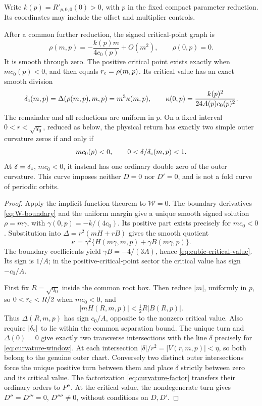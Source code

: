 Write \(k(p)=R'_{p,0,0}(0)>0\), with \(p\) in the fixed compact
parameter reduction. Its coordinates may include the offset and
multiplier controls.

\begin{proposition}
\label{prop:cubic-curvature-window}
After a common further reduction, the signed critical-point graph is
\[
 \rho(m,p)=-\frac{k(p)m}{4c_0(p)}+O(m^2),\qquad \rho(0,p)=0.
\]
It is smooth through zero. The positive critical point exists exactly
when \(mc_0(p)<0\), and then equals \(r_{\rm c}=\rho(m,p)\).
Its critical value has an exact smooth division
\begin{equation}\label{eq:cubic-critical-value}
 \delta_{\rm c}(m,p)=\Delta(\rho(m,p),m,p)=m^3\kappa(m,p),
 \qquad \kappa(0,p)=\frac{k(p)^2}{24A(p)c_0(p)^2}.
\end{equation}
The remainder and all reductions are uniform in \(p\).
On a fixed interval \(0<r<\sqrt{q_0}\), reduced as below, the
physical return has exactly two simple outer curvature zeros if and
only if
\begin{equation}\label{eq:curvature-window}
 mc_0(p)<0,\qquad 0<\delta/\delta_{\rm c}(m,p)<1.
\end{equation}
At \(\delta=\delta_{\rm c}\), \(mc_0<0\), it instead has one
ordinary double zero of the outer curvature. This curve imposes neither
\(D=0\) nor \(D'=0\), and is not a fold curve of periodic orbits.
\end{proposition}

\begin{proof}
Apply the implicit function theorem to \(\mathcal W=0\).
The boundary derivatives \eqref{eq:W-boundary} and the uniform margin
give a unique smooth signed solution \(\rho=m\gamma\), with
\(\gamma(0,p)=-k/(4c_0)\). Its positive part exists precisely for
\(mc_0<0\).
Substitution into \(\Delta=r^2(mH+rB)\) gives the smooth quotient
\[
 \kappa=\gamma^2\{H(m\gamma,m,p)+\gamma B(m\gamma,p)\}.
\]
The boundary coefficients yield \(\gamma B=-4/(3A)\), hence
\eqref{eq:cubic-critical-value}. Its sign is \(1/A\); in the
positive-critical-point sector the critical value has sign
\(-c_0/A\).

First fix \(R=\sqrt{q_0}\) inside the common root box. Then reduce
\(|m|\), uniformly in \(p\), so \(0<r_{\rm c}<R/2\) when
\(mc_0<0\), and
\[
 |mH(R,m,p)|<\tfrac12R|B(R,p)|.
\]
Thus \(\Delta(R,m,p)\) has sign \(c_0/A\), opposite to the
nonzero critical value. Also require \(|\delta_{\rm c}|\) to lie
within the common separation bound. The unique turn and
\(\Delta(0)=0\) give exactly two transverse intersections with the
line \(\delta\) precisely for \eqref{eq:curvature-window}.
At each intersection \(|\delta|/r^2=|V(r,m,p)|<\eta\), so both
belong to the genuine outer chart. Conversely two distinct outer
intersections force the unique positive turn between them and place
\(\delta\) strictly between zero and its critical value.
The factorization \eqref{eq:curvature-factor} transfers their ordinary
orders to \(P''\). At the critical value, the nondegenerate turn gives
\(D''=D'''=0\), \(D''''\ne0\), without conditions on \(D,D'\).
\end{proof}


